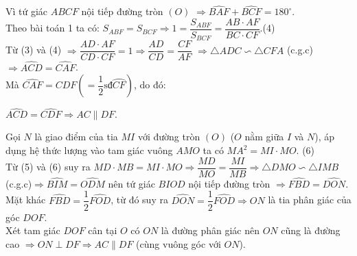 \begin{bt}
{Vì tứ giác $ABCF$ nội tiếp đường tròn $(O)$ $\Rightarrow \widehat{BAF}+\widehat{BCF}=180^\circ$.\\ Theo bài toán 1 ta có: $S_{ABF}=S_{BCF}\Rightarrow 1=\dfrac{S_{ABF}}{S_{BCF}}=\dfrac{AB\cdot AF}{BC\cdot CF}$.\hfill(4)\\
Từ (3) và (4) $\Rightarrow \dfrac{AD\cdot AF}{CD\cdot CF}=1\Rightarrow \dfrac{AD}{CD}=\dfrac{CF}{AF}$
$\Rightarrow \triangle ADC\backsim \triangle CFA$ (c.g.c)$\Rightarrow \widehat{ACD}=\widehat{CAF}$.\\
Mà $\widehat{CAF}=\widehat{CDF}\left(=\dfrac{1}{2}\text{sđ}\wideparen{CF} \right)$, do đó:
\begin{center}
$\widehat{ACD}=\widehat{CDF}\Rightarrow AC\parallel DF.$
\end{center}
\begin{nx}
{}
\noindent
Gọi $N$ là giao điểm của tia $MI$ với đường tròn $(O)$ ($O$ nằm giữa $I$ và $N$), áp dụng hệ thức lượng vào tam giác vuông $AMO$ ta có $MA^2=MI\cdot MO$. \hfill(6)\\
Từ (5) và (6) suy ra $MD\cdot MB=MI\cdot MO\Rightarrow \dfrac{MD}{MO}=\dfrac{MI}{MB}\Rightarrow \triangle DMO\backsim \triangle IMB$ (c.g.c)$\Rightarrow \widehat{BIM}=\widehat{ODM}$ nên tứ giác $BIOD$ nội tiếp đường tròn $\Rightarrow \widehat{FBD}=\widehat{DON}$.\\
Mặt khác $\widehat{FBD}=\dfrac{1}{2}\widehat{FOD}$, từ đó suy ra $\widehat{DON}=\dfrac{1}{2}\widehat{FOD}\Rightarrow ON$ là tia phân giác của góc $DOF$.\\
Xét tam giác $DOF$ cân tại $O$ có $ON$ là đường phân giác nên $ON$ cũng là đường cao $\Rightarrow ON\perp DF\Rightarrow AC\parallel DF$ (cùng vuông góc với $ON$).
\end{nx}
}
\end{bt}


